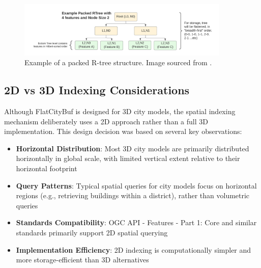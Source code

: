 \begin{figure}[ht]
  \centering
  \includegraphics[width=0.9\textwidth]{./figs/methodology/packed_rtree.png}
  \caption{Example of a packed R-tree structure. Image sourced from \cite{horance_2022_overview}.}
  \label{fig:packed_rtree}
\end{figure}

\subsection{2D vs 3D Indexing Considerations}
\label{methodology:spatial_index:2d_vs_3d_indexing}

Although FlatCityBuf is designed for 3D city models, the spatial indexing mechanism deliberately uses a 2D approach rather than a full 3D implementation. This design decision was based on several key observations:

\begin{itemize}
  \item \textbf{Horizontal Distribution}: Most 3D city models are primarily distributed horizontally in global scale, with limited vertical extent relative to their horizontal footprint
  \item \textbf{Query Patterns}: Typical spatial queries for city models focus on horizontal regions (e.g., retrieving buildings within a district), rather than volumetric queries
  \item \textbf{Standards Compatibility}: OGC API - Features - Part 1: Core \citep{ogc_api_2019} and similar standards primarily support 2D spatial querying
  \item \textbf{Implementation Efficiency}: 2D indexing is computationally simpler and more storage-efficient than 3D alternatives
\end{itemize}
